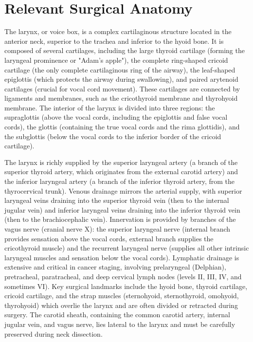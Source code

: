 \section*{Relevant Surgical Anatomy}
The larynx, or voice box, is a complex cartilaginous structure located in the anterior neck, superior to the trachea and inferior to the hyoid bone. It is composed of several cartilages, including the large thyroid cartilage (forming the laryngeal prominence or "Adam's apple"), the complete ring-shaped cricoid cartilage (the only complete cartilaginous ring of the airway), the leaf-shaped epiglottis (which protects the airway during swallowing), and paired arytenoid cartilages (crucial for vocal cord movement). These cartilages are connected by ligaments and membranes, such as the cricothyroid membrane and thyrohyoid membrane. The interior of the larynx is divided into three regions: the supraglottis (above the vocal cords, including the epiglottis and false vocal cords), the glottis (containing the true vocal cords and the rima glottidis), and the subglottis (below the vocal cords to the inferior border of the cricoid cartilage).

The larynx is richly supplied by the superior laryngeal artery (a branch of the superior thyroid artery, which originates from the external carotid artery) and the inferior laryngeal artery (a branch of the inferior thyroid artery, from the thyrocervical trunk). Venous drainage mirrors the arterial supply, with superior laryngeal veins draining into the superior thyroid vein (then to the internal jugular vein) and inferior laryngeal veins draining into the inferior thyroid vein (then to the brachiocephalic vein). Innervation is provided by branches of the vagus nerve (cranial nerve X): the superior laryngeal nerve (internal branch provides sensation above the vocal cords, external branch supplies the cricothyroid muscle) and the recurrent laryngeal nerve (supplies all other intrinsic laryngeal muscles and sensation below the vocal cords). Lymphatic drainage is extensive and critical in cancer staging, involving prelaryngeal (Delphian), pretracheal, paratracheal, and deep cervical lymph nodes (levels II, III, IV, and sometimes VI). Key surgical landmarks include the hyoid bone, thyroid cartilage, cricoid cartilage, and the strap muscles (sternohyoid, sternothyroid, omohyoid, thyrohyoid) which overlie the larynx and are often divided or retracted during surgery. The carotid sheath, containing the common carotid artery, internal jugular vein, and vagus nerve, lies lateral to the larynx and must be carefully preserved during neck dissection.

